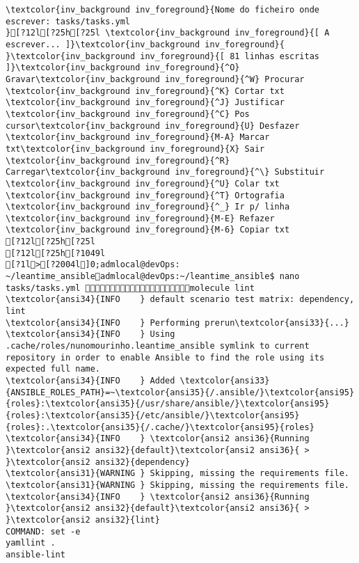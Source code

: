 \documentclass{scrartcl}
\begin{document}
\begin{Verbatim}
\textcolor{inv_background inv_foreground}{Nome do ficheiro onde escrever: tasks/tasks.yml                                                                                           }[?12l[?25h[?25l \textcolor{inv_background inv_foreground}{[ A escrever... ]}\textcolor{inv_background inv_foreground}{          }\textcolor{inv_background inv_foreground}{[ 81 linhas escritas ]}\textcolor{inv_background inv_foreground}{^O} Gravar\textcolor{inv_background inv_foreground}{^W} Procurar      \textcolor{inv_background inv_foreground}{^K} Cortar txt    \textcolor{inv_background inv_foreground}{^J} Justificar    \textcolor{inv_background inv_foreground}{^C} Pos cursor\textcolor{inv_background inv_foreground}{U} Desfazer     \textcolor{inv_background inv_foreground}{M-A} Marcar txt\textcolor{inv_background inv_foreground}{X} Sair    \textcolor{inv_background inv_foreground}{^R} Carregar\textcolor{inv_background inv_foreground}{^\} Substituir    \textcolor{inv_background inv_foreground}{^U} Colar txt     \textcolor{inv_background inv_foreground}{^T} Ortografia    \textcolor{inv_background inv_foreground}{^_} Ir p/ linha   \textcolor{inv_background inv_foreground}{M-E} Refazer      \textcolor{inv_background inv_foreground}{M-6} Copiar txt
[?12l[?25h[?25l
[?12l[?25h[?1049l
[?1l>[?2004l]0;admlocal@devOps: ~/leantime_ansibleadmlocal@devOps:~/leantime_ansible$ nano tasks/tasks.yml molecule lint
\textcolor{ansi34}{INFO    } default scenario test matrix: dependency, lint
\textcolor{ansi34}{INFO    } Performing prerun\textcolor{ansi33}{...}
\textcolor{ansi34}{INFO    } Using .cache/roles/nunomourinho.leantime_ansible symlink to current repository in order to enable Ansible to find the role using its expected full name.
\textcolor{ansi34}{INFO    } Added \textcolor{ansi33}{ANSIBLE_ROLES_PATH}=~\textcolor{ansi35}{/.ansible/}\textcolor{ansi95}{roles}:\textcolor{ansi35}{/usr/share/ansible/}\textcolor{ansi95}{roles}:\textcolor{ansi35}{/etc/ansible/}\textcolor{ansi95}{roles}:.\textcolor{ansi35}{/.cache/}\textcolor{ansi95}{roles}
\textcolor{ansi34}{INFO    } \textcolor{ansi2 ansi36}{Running }\textcolor{ansi2 ansi32}{default}\textcolor{ansi2 ansi36}{ > }\textcolor{ansi2 ansi32}{dependency}
\textcolor{ansi31}{WARNING } Skipping, missing the requirements file.
\textcolor{ansi31}{WARNING } Skipping, missing the requirements file.
\textcolor{ansi34}{INFO    } \textcolor{ansi2 ansi36}{Running }\textcolor{ansi2 ansi32}{default}\textcolor{ansi2 ansi36}{ > }\textcolor{ansi2 ansi32}{lint}
COMMAND: set -e
yamllint .
ansible-lint


\end{Verbatim}
\end{document}
